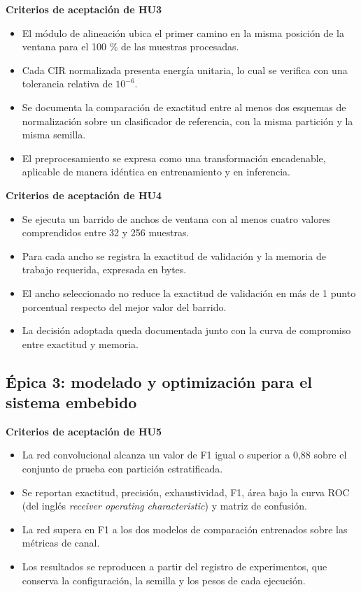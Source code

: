 \documentclass[
11pt, %
]{charter}
\begin{document}
\textbf{Criterios de aceptación de HU3}
\begin{itemize}
    \item El módulo de alineación ubica el primer camino en la misma posición de la ventana para el 100 \% de las muestras procesadas.
    \item Cada CIR normalizada presenta energía unitaria, lo cual se verifica con una tolerancia relativa de $10^{-6}$.
    \item Se documenta la comparación de exactitud entre al menos dos esquemas de normalización sobre un clasificador de referencia, con la misma partición y la misma semilla.
    \item El preprocesamiento se expresa como una transformación encadenable, aplicable de manera idéntica en entrenamiento y en inferencia.
\end{itemize}

\textbf{Criterios de aceptación de HU4}
\begin{itemize}
    \item Se ejecuta un barrido de anchos de ventana con al menos cuatro valores comprendidos entre 32 y 256 muestras.
    \item Para cada ancho se registra la exactitud de validación y la memoria de trabajo requerida, expresada en bytes.
    \item El ancho seleccionado no reduce la exactitud de validación en más de 1 punto porcentual respecto del mejor valor del barrido.
    \item La decisión adoptada queda documentada junto con la curva de compromiso entre exactitud y memoria.
\end{itemize}

\subsection{Épica 3: modelado y optimización para el sistema embebido}

\textbf{Criterios de aceptación de HU5}
\begin{itemize}
    \item La red convolucional alcanza un valor de F1 igual o superior a 0,88 sobre el conjunto de prueba con partición estratificada.
    \item Se reportan exactitud, precisión, exhaustividad, F1, área bajo la curva ROC (del inglés \textit{receiver operating characteristic}) y matriz de confusión.
    \item La red supera en F1 a los dos modelos de comparación entrenados sobre las métricas de canal.
    \item Los resultados se reproducen a partir del registro de experimentos, que conserva la configuración, la semilla y los pesos de cada ejecución.
\end{itemize}
\end{document}
